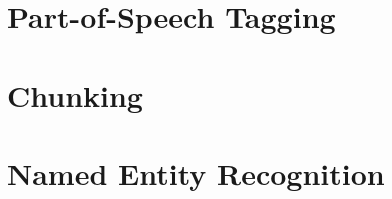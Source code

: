 \section[POS]{Part-of-Speech Tagging}




\section[Chunk]{Chunking}



\section[NER]{Named Entity Recognition}





